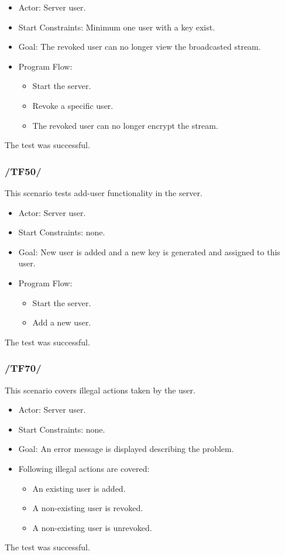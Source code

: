 \documentclass[a4paper,10pt]{scrartcl}
\begin{document}
\begin{itemize}
	\item Actor: Server user.
	\item Start Constraints: Minimum one user with a key exist.
	\item Goal: The revoked user can no longer view the broadcasted stream.
	\item Program Flow:
	\begin{itemize}
   \item Start the server.
   \item Revoke a specific user.
   \item The revoked user can no longer encrypt the stream.
\end{itemize}
\end{itemize}
The test was successful.


\subsubsection{/TF50/}
This scenario tests add-user functionality in the server.

\begin{itemize}
	\item Actor: Server user.
	\item Start Constraints: none.
	\item Goal: New user is added and a new key is generated and assigned to this user.
	\item Program Flow:
	\begin{itemize}
   \item Start the server.
   \item Add a new user.
\end{itemize}
\end{itemize}
The test was successful.

\subsubsection{/TF70/}
This scenario covers illegal actions taken by the user.

\begin{itemize}
	\item Actor: Server user.
	\item Start Constraints: none.
	\item Goal: An error message is displayed describing the problem.
	\item Following illegal actions are covered:
	\begin{itemize}
   \item An existing user is added.
   \item A non-existing user is revoked.
   \item A non-existing user is unrevoked.
\end{itemize}
\end{itemize}
The test was successful.
\end{document}
